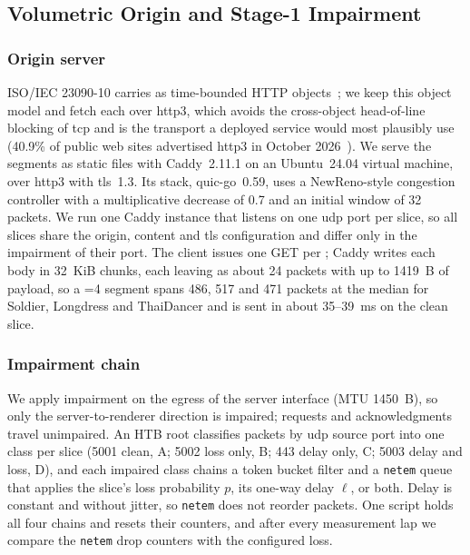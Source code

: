 \subsection{Volumetric Origin and Stage-1 Impairment}
\label{sec:sys-stage1}

\subsubsection{Origin server}
ISO/IEC 23090-10 carries \vpcc as time-bounded HTTP
objects~\cite{v3ccarriage}; we keep this object model and
fetch each \gof over \gls{http3}, which avoids the cross-object
head-of-line blocking of \gls{tcp} and is the transport a deployed
service would most plausibly use (40.9\% of public web sites advertised
\gls{http3} in October 2026~\cite{w3techs2026}). We serve the segments as
static files with Caddy~2.11.1 on an Ubuntu~24.04 virtual machine,
over \gls{http3} with \gls{tls}~1.3. Its \quic stack, quic-go~0.59, uses
a NewReno-style congestion controller with a multiplicative decrease of
0.7 and an initial window of 32 packets. We run one Caddy instance that listens on
one \gls{udp} port per slice, so all slices share the origin, content
and \gls{tls} configuration and differ only in the impairment of their
port. The client issues one GET per \gof; Caddy writes each body in
\SI{32}{KiB} chunks, each leaving as about 24 packets with up to
\SI{1419}{B} of \quic payload, so a \gof{}=4 segment spans 486, 517
and 471 packets at the median for Soldier, Longdress and ThaiDancer and
is sent in about 35--\SI{39}{\milli\second} on the clean slice.

\subsubsection{Impairment chain}
We apply impairment on the egress of the server interface (MTU
\SI{1450}{B}), so only the server-to-renderer direction is impaired;
requests and acknowledgments travel unimpaired. An HTB root classifies
packets by \gls{udp} source port into one class per slice (5001 clean,
A; 5002 loss only, B; 443 delay only, C; 5003 delay and loss, D), and
each impaired class chains a token bucket filter and a \texttt{netem}
queue that applies the slice's loss probability $p$, its one-way delay
$\ell$, or both. Delay is constant and without jitter, so
\texttt{netem} does not reorder packets. One script holds all four chains and resets their counters, and after
every measurement lap we compare the \texttt{netem} drop counters with
the configured loss.

